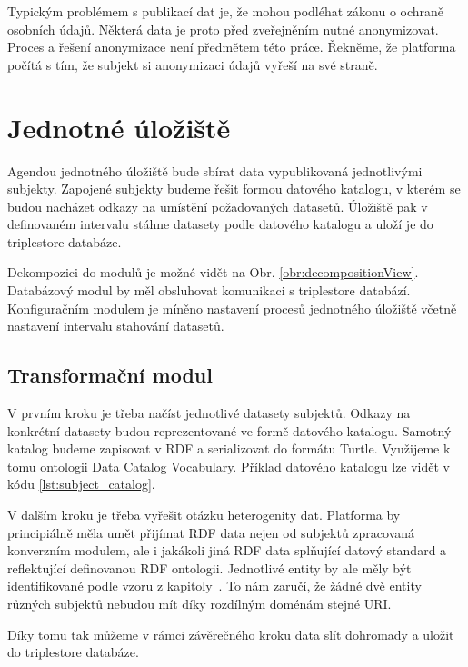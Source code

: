 Typickým problémem s publikací dat je, že mohou podléhat zákonu o ochraně osobních údajů\cite{z101}. Některá data je proto před zveřejněním nutné anonymizovat. Proces a řešení anonymizace není předmětem této práce. Řekněme, že platforma počítá s tím, že subjekt si anonymizaci údajů vyřeší na své straně.

\section{Jednotné úložiště}

Agendou jednotného úložiště bude sbírat data vypublikovaná jednotlivými subjekty. Zapojené subjekty budeme řešit formou datového katalogu, v kterém se budou nacházet odkazy na umístění požadovaných datasetů. Úložiště pak v definovaném intervalu stáhne datasety podle datového katalogu a uloží je do triplestore databáze.

Dekompozici do modulů je možné vidět na Obr. \ref{obr:decompositionView}. Databázový modul by měl obsluhovat komunikaci s triplestore databází. Konfiguračním modulem je míněno nastavení procesů jednotného úložiště včetně nastavení intervalu stahování datasetů.

\subsection*{Transformační modul}

V prvním kroku je třeba načíst jednotlivé datasety subjektů. Odkazy na konkrétní datasety budou reprezentované ve formě datového katalogu. Samotný katalog budeme zapisovat v RDF a serializovat do formátu Turtle. Využijeme k tomu ontologii Data Catalog Vocabulary. Příklad datového katalogu lze vidět v kódu \ref{lst:subject_catalog}.

V dalším kroku je třeba vyřešit otázku heterogenity dat. Platforma by principiálně měla umět přijímat RDF data nejen od subjektů zpracovaná konverzním modulem, ale i jakákoli jiná RDF data splňující datový standard a reflektující definovanou RDF ontologii. Jednotlivé entity by ale měly být identifikované podle vzoru z kapitoly~. To nám zaručí, že žádné dvě entity různých subjektů nebudou mít díky rozdílným doménám stejné URI. 

Díky tomu tak můžeme v rámci závěrečného kroku data slít dohromady a uložit do triplestore databáze.



